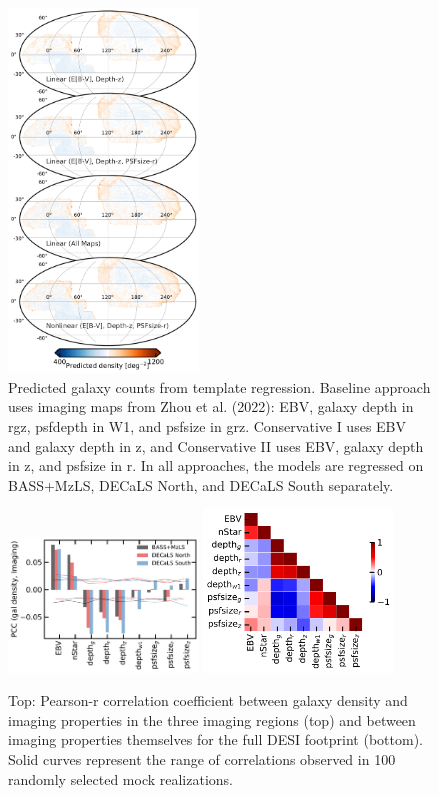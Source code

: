 \begin{figure}
    \centering
    \includegraphics[width=0.45\textwidth]{figures/npred.pdf}
    \caption{Predicted galaxy counts from template regression. Baseline approach uses imaging maps from Zhou et al. (2022): EBV, galaxy depth in rgz, psfdepth in W1, and psfsize in grz. Conservative I uses EBV and galaxy depth in z, and Conservative II uses EBV, galaxy depth in z, and psfsize in r. In all approaches, the models are regressed on BASS+MzLS, DECaLS North, and DECaLS South separately.}
    \label{fig:npred}
\end{figure}

\begin{figure}
    \includegraphics[width=0.45\textwidth]{figures/pcc.pdf} 
    \includegraphics[width=0.45\textwidth]{figures/pccx.pdf}     
    \caption{Top: Pearson-r correlation coefficient between galaxy density and imaging properties in the three imaging regions (top) and between imaging properties themselves for the full DESI footprint (bottom). Solid curves represent the range of correlations observed in 100 randomly selected mock realizations.}
    \label{fig:pcc}
\end{figure}


